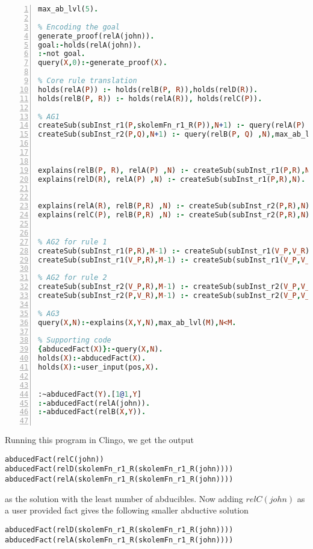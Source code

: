 \documentclass{article}
\begin{document}
\begin{lstlisting}[language=Prolog, numbers=left]
max_ab_lvl(5).

% Encoding the goal
generate_proof(relA(john)).
goal:-holds(relA(john)).
:-not goal.
query(X,0):-generate_proof(X).

% Core rule translation
holds(relA(P)) :- holds(relB(P, R)),holds(relD(R)).
holds(relB(P, R)) :- holds(relA(R)), holds(relC(P)).

% AG1
createSub(subInst_r1(P,skolemFn_r1_R(P)),N+1) :- query(relA(P) ,N),max_ab_lvl(M),N<M-1.
createSub(subInst_r2(P,Q),N+1) :- query(relB(P, Q) ,N),max_ab_lvl(M),N<M-1.



explains(relB(P, R), relA(P) ,N) :- createSub(subInst_r1(P,R),N).
explains(relD(R), relA(P) ,N) :- createSub(subInst_r1(P,R),N).


explains(relA(R), relB(P,R) ,N) :- createSub(subInst_r2(P,R),N).
explains(relC(P), relB(P,R) ,N) :- createSub(subInst_r2(P,R),N).


% AG2 for rule 1
createSub(subInst_r1(P,R),M-1) :- createSub(subInst_r1(V_P,V_R),N), holds(relB(P, R)),max_ab_lvl(M).
createSub(subInst_r1(V_P,R),M-1) :- createSub(subInst_r1(V_P,V_R),N), holds(relD(R)),max_ab_lvl(M).

% AG2 for rule 2
createSub(subInst_r2(V_P,R),M-1) :- createSub(subInst_r2(V_P,V_R),N), holds(relA(R)),max_ab_lvl(M).
createSub(subInst_r2(P,V_R),M-1) :- createSub(subInst_r2(V_P,V_R),N), holds(relC(P)),max_ab_lvl(M).

% AG3
query(X,N):-explains(X,Y,N),max_ab_lvl(M),N<M.

% Supporting code
{abducedFact(X)}:-query(X,N).
holds(X):-abducedFact(X).
holds(X):-user_input(pos,X).


:~abducedFact(Y).[1@1,Y]
:-abducedFact(relA(john)).
:-abducedFact(relB(X,Y)).


\end{lstlisting}
Running this program in Clingo, we get the output 
\begin{verbatim}
abducedFact(relC(john))
abducedFact(relD(skolemFn_r1_R(skolemFn_r1_R(john))))
abducedFact(relA(skolemFn_r1_R(skolemFn_r1_R(john))))    
\end{verbatim}
as the solution with the least number of abducibles.
Now adding $relC(john)$ as a user provided fact gives the following smaller abductive solution
\begin{verbatim}
abducedFact(relD(skolemFn_r1_R(skolemFn_r1_R(john))))
abducedFact(relA(skolemFn_r1_R(skolemFn_r1_R(john))))    
\end{verbatim}
\end{document}
